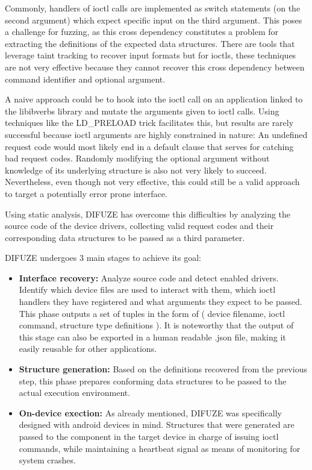 Commonly, handlers of ioctl calls are implemented as switch statements (on the second argument) which expect specific
input on the third argument. This poses a challenge for fuzzing, as this cross dependency constitutes a problem for extracting
the definitions of the expected data structures. There are tools that leverage taint tracking to recover input formats\cite{ganeshTaintbasedDirectedWhitebox2009}\cite{hallerDowserGuidedFuzzer2013}
but for ioctls, these techniques are not very effective\cite{corinaDIFUZEInterfaceAware2017} because they cannot recover this cross dependency between command identifier
and optional argument.

A naive approach could be to hook into the ioctl call on an application linked to the libibverbs library and mutate the arguments given to ioctl calls. Using techniques like the LD\_PRELOAD trick facilitates this,
but results are rarely successful because ioctl arguments are highly constrained in nature: An undefined request code
would most likely end in a default clause that serves for catching bad request codes. Randomly modifying the optional argument
without knowledge of its underlying structure is also not very likely to succeed.
Nevertheless, even though not very effective, this could still be a valid approach to target a potentially error prone interface.

Using static analysis, DIFUZE has overcome this difficulties by analyzing the source code of the device drivers,
collecting valid request codes and their corresponding data structures to be passed as a third parameter.

DIFUZE undergoes 3 main stages to achieve its goal:

\begin{itemize}
  \item \textbf{Interface recovery:} Analyze source code and detect enabled drivers. Identify which device files are used to interact with them, which ioctl handlers they have registered and what arguments they expect to be passed. This phase outputs a set of tuples in the form of ( device filename, ioctl command, structure type definitions ). It is noteworthy that the output of this stage can also be exported in a human readable .json file, making it easily reusable for other applications.
  \item \textbf{Structure generation:} Based on the definitions recovered from the previous step, this phase prepares conforming data structures to be passed to the actual execution environment.
  \item \textbf{On-device exection:} As already mentioned, DIFUZE was specifically designed with android devices in mind. Structures that were generated are passed to the component in the target device in charge of issuing ioctl commands, while maintaining a heartbeat signal as means of monitoring for system crashes.
\end{itemize}

